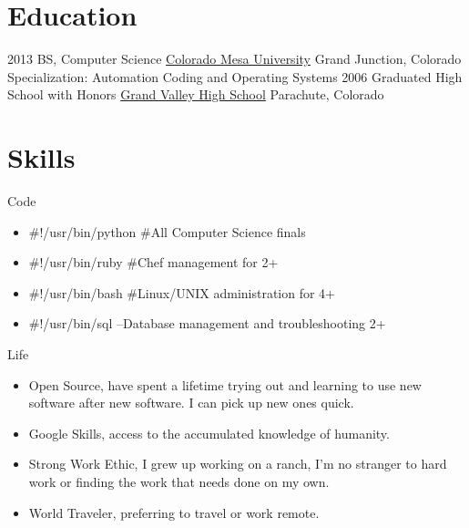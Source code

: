 \documentclass[letterpaper]{twentysecondcv} %
\begin{document}
\makeprofile %

\section{Education}

\begin{twenty} %
	\twentyitem
    	{2013}
        {BS, Computer Science}
        {\href{http://www.coloradomesa.edu/}{Colorado Mesa University}}
        {Grand Junction, Colorado}
        {Specialization: Automation Coding and Operating Systems}
    \twentyitem
    	{2006}
        {Graduated High School with Honors}
        {\href{http://gvhs.garfield16.org/}{Grand Valley High School}}
        {Parachute, Colorado}
        {}
\end{twenty}


\section{Skills}
\begin{twenty}
	\twentyitem
    	{}
        {Code}
        {}
        {}
        {
        {\begin{itemize}
        \item \#!/usr/bin/python \#All Computer Science finals 
        \item \#!/usr/bin/ruby \#Chef management for 2+
        \item \#!/usr/bin/bash \#Linux/UNIX administration for 4+
        \item \#!/usr/bin/sql --Database management and troubleshooting 2+
    \end{itemize}}
        }
\end{twenty}

\begin{twenty}
	\twentyitem
    	{}
        {Life}
        {}
        {}
        {
        {\begin{itemize}
        \item Open Source, have spent a lifetime trying out and learning to use new software after new software. I can pick up new ones quick.
        \item Google Skills, access to the accumulated knowledge of humanity.
        \item Strong Work Ethic, I grew up working on a ranch, I'm no stranger to hard work or finding the work that needs done on my own.
        \item World Traveler, preferring to travel or work remote.
    \end{itemize}}
        }
\end{twenty}
\end{document}

